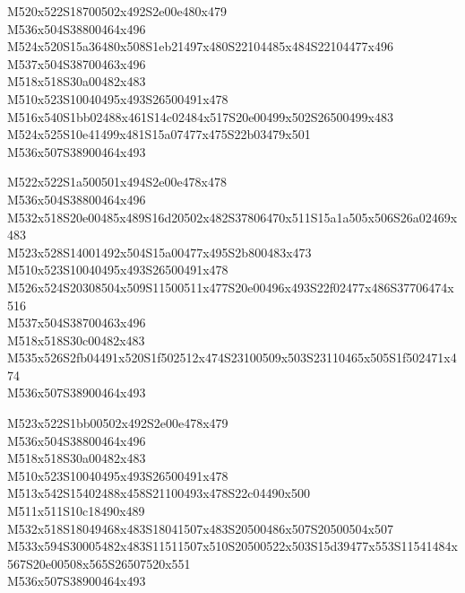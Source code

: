 \documentclass{article}
\begin{document}
\begin{multicols}{5}
\begin{center}

M520x522S18700502x492S2e00e480x479 %
\\M536x504S38800464x496 %
\\M524x520S15a36480x508S1eb21497x480S22104485x484S22104477x496 %
\\M537x504S38700463x496 %
\\M518x518S30a00482x483 %
\\M510x523S10040495x493S26500491x478 %
\\M516x540S1bb02488x461S14c02484x517S20e00499x502S26500499x483 %
\\M524x525S10e41499x481S15a07477x475S22b03479x501 %
\\M536x507S38900464x493 %
\vfil
\columnbreak

M522x522S1a500501x494S2e00e478x478 %
\\M536x504S38800464x496 %
\\M532x518S20e00485x489S16d20502x482S37806470x511S15a1a505x506S26a02469x483 %
\\M523x528S14001492x504S15a00477x495S2b800483x473 %
\\M510x523S10040495x493S26500491x478 %
\\M526x524S20308504x509S11500511x477S20e00496x493S22f02477x486S37706474x516 %
\\M537x504S38700463x496 %
\\M518x518S30c00482x483 %
\\M535x526S2fb04491x520S1f502512x474S23100509x503S23110465x505S1f502471x474 %
\\M536x507S38900464x493 %
\vfil
\columnbreak

M523x522S1bb00502x492S2e00e478x479 %
\\M536x504S38800464x496 %
\\M518x518S30a00482x483 %
\\M510x523S10040495x493S26500491x478 %
\\M513x542S15402488x458S21100493x478S22c04490x500 %
\\M511x511S10c18490x489 %
\\M532x518S18049468x483S18041507x483S20500486x507S20500504x507 %
\\M533x594S30005482x483S11511507x510S20500522x503S15d39477x553S11541484x567S20e00508x565S26507520x551 %
\\M536x507S38900464x493 %
\vfil
\columnbreak


\end{center}
\end{multicols}
\end{document}
